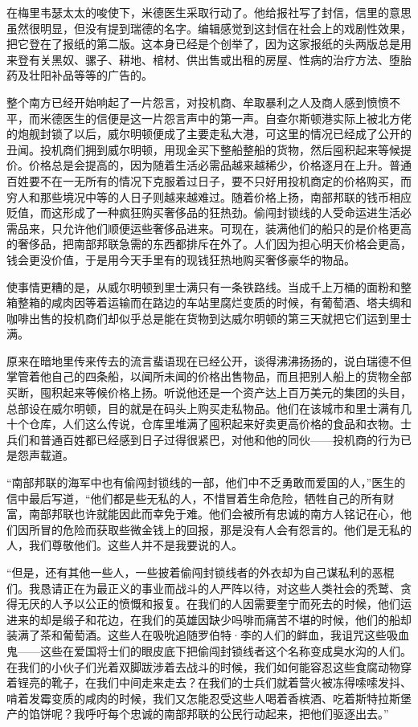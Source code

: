 \par 在梅里韦瑟太太的唆使下，米德医生采取行动了。他给报社写了封信，信里的意思虽然很明显，但没有提到瑞德的名字。编辑感觉到这封信在社会上的戏剧性效果，把它登在了报纸的第二版。这本身已经是个创举了，因为这家报纸的头两版总是用来登有关黑奴、骡子、耕地、棺材、供出售或出租的房屋、性病的治疗方法、堕胎药及壮阳补品等等的广告的。
\par 整个南方已经开始响起了一片怨言，对投机商、牟取暴利之人及商人感到愤愤不平，而米德医生的信便是这一片怨言声中的第一声。自查尔斯顿港实际上被北方佬的炮舰封锁了以后，威尔明顿便成了主要走私大港，可这里的情况已经成了公开的丑闻。投机商们拥到威尔明顿，用现金买下整船整船的货物，然后囤积起来等候提价。价格总是会提高的，因为随着生活必需品越来越稀少，价格逐月在上升。普通百姓要不在一无所有的情况下克服着过日子，要不只好用投机商定的价格购买，而穷人和那些境况中等的人日子则越来越难过。随着价格上扬，南部邦联的钱币相应贬值，而这形成了一种疯狂购买奢侈品的狂热劲。偷闯封锁线的人受命运进生活必需品来，只允许他们顺便运些奢侈品进来。可现在，装满他们的船只的是价格更高的奢侈品，把南部邦联急需的东西都排斥在外了。人们因为担心明天价格会更高，钱会更没价值，于是用今天手里有的现钱狂热地购买奢侈豪华的物品。
\par 使事情更糟的是，从威尔明顿到里士满只有一条铁路线。当成千上万桶的面粉和整箱整箱的咸肉因等着运输而在路边的车站里腐烂变质的时候，有葡萄酒、塔夫绸和咖啡出售的投机商们却似乎总是能在货物到达威尔明顿的第三天就把它们运到里士满。
\par 原来在暗地里传来传去的流言蜚语现在已经公开，谈得沸沸扬扬的，说白瑞德不但掌管着他自己的四条船，以闻所未闻的价格出售物品，而且把别人船上的货物全部买断，囤积起来等候价格上扬。听说他还是一个资产达上百万美元的集团的头目，总部设在威尔明顿，目的就是在码头上购买走私物品。他们在该城市和里士满有几十个仓库，人们这么传说，仓库里堆满了囤积起来好卖更高价格的食品和衣物。士兵们和普通百姓都已经感到日子过得很紧巴，对他和他的同伙——投机商的行为已是怨声载道。
\par “南部邦联的海军中也有偷闯封锁线的一部，他们中不乏勇敢而爱国的人，”医生的信中最后写道，“他们都是些无私的人，不惜冒着生命危险，牺牲自己的所有财富，南部邦联也许就能因此而幸免于难。他们会被所有忠诚的南方人铭记在心，他们因所冒的危险而获取些微金钱上的回报，那是没有人会有怨言的。他们是无私的人，我们尊敬他们。这些人并不是我要说的人。
\par “但是，还有其他一些人，一些披着偷闯封锁线者的外衣却为自己谋私利的恶棍们。我恳请正在为最正义的事业而战斗的人严阵以待，对这些人类社会的秃鹫、贪得无厌的人予以公正的愤慨和报复。在我们的人因需要奎宁而死去的时候，他们运进来的却是缎子和花边，在我们的英雄因缺少吗啡而痛苦不堪的时候，他们的船却装满了茶和葡萄酒。这些人在吸吮追随罗伯特·李的人们的鲜血，我诅咒这些吸血鬼——这些在爱国将士们的眼皮底下把偷闯封锁线者这个名称变成臭水沟的人们。在我们的小伙子们光着双脚跋涉着去战斗的时候，我们如何能容忍这些食腐动物穿着锃亮的靴子，在我们中间走来走去？在我们的士兵们就着营火被冻得嗦嗦发抖、啃着发霉变质的咸肉的时候，我们又怎能忍受这些人喝着香槟酒、吃着斯特拉斯堡产的馅饼呢？我呼吁每个忠诚的南部邦联的公民行动起来，把他们驱逐出去。”
